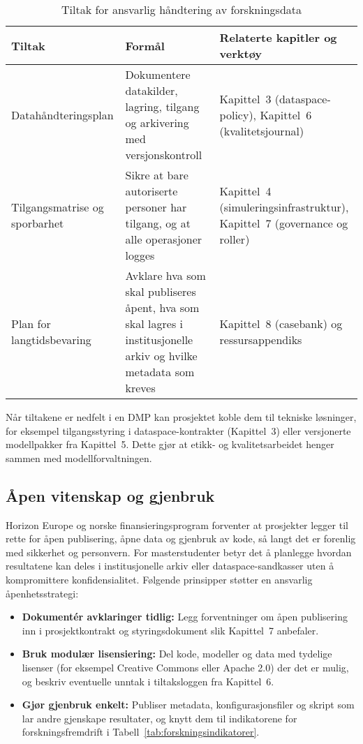 \begin{table}[h]
    \centering
    \caption{Tiltak for ansvarlig håndtering av forskningsdata}
    \label{tab:forskningsdata-tiltak}
    \begin{tabular}{|p{3.2cm}|p{5.0cm}|p{4.2cm}|}
        \hline
        \textbf{Tiltak} & \textbf{Formål} & \textbf{Relaterte kapitler og verktøy} \\
        \hline
        Datahåndteringsplan & Dokumentere datakilder, lagring, tilgang og arkivering med versjonskontroll & Kapittel~3 (dataspace-policy), Kapittel~6 (kvalitetsjournal) \\
        \hline
        Tilgangsmatrise og sporbarhet & Sikre at bare autoriserte personer har tilgang, og at alle operasjoner logges & Kapittel~4 (simuleringsinfrastruktur), Kapittel~7 (governance og roller) \\
        \hline
        Plan for langtidsbevaring & Avklare hva som skal publiseres åpent, hva som skal lagres i institusjonelle arkiv og hvilke metadata som kreves & Kapittel~8 (casebank) og ressursappendiks \\
        \hline
    \end{tabular}
\end{table}

Når tiltakene er nedfelt i en DMP kan prosjektet koble dem til tekniske løsninger, for eksempel tilgangsstyring i dataspace-kontrakter (Kapittel~3) eller versjonerte modellpakker fra Kapittel~5. Dette gjør at etikk- og kvalitetsarbeidet henger sammen med modellforvaltningen.

\subsection{Åpen vitenskap og gjenbruk}
Horizon Europe og norske finansieringsprogram forventer at prosjekter legger til rette for åpen publisering, åpne data og gjenbruk av kode, så langt det er forenlig med sikkerhet og personvern.\citep{eu2023ai,forskningsradet2023aapen} For masterstudenter betyr det å planlegge hvordan resultatene kan deles i institusjonelle arkiv eller dataspace-sandkasser uten å kompromittere konfidensialitet. Følgende prinsipper støtter en ansvarlig åpenhetsstrategi:
\begin{itemize}
    \item \textbf{Dokumentér avklaringer tidlig:} Legg forventninger om åpen publisering inn i prosjektkontrakt og styringsdokument slik Kapittel~7 anbefaler.
    \item \textbf{Bruk modulær lisensiering:} Del kode, modeller og data med tydelige lisenser (for eksempel Creative Commons eller Apache 2.0) der det er mulig, og beskriv eventuelle unntak i tiltaksloggen fra Kapittel~6.
    \item \textbf{Gjør gjenbruk enkelt:} Publiser metadata, konfigurasjonsfiler og skript som lar andre gjenskape resultater, og knytt dem til indikatorene for forskningsfremdrift i Tabell~\ref{tab:forskningsindikatorer}.
\end{itemize}

